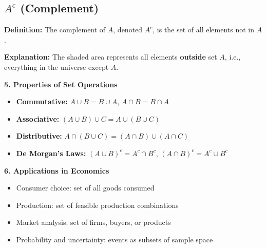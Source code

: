 \begin{tcolorbox}[sectionbox]
\subsection*{$A^c$ (Complement)}
\textbf{Definition:} The complement of $A$, denoted $A^c$, is the set of all elements not in $A$.  

\begin{center}
\end{center}

\textbf{Explanation:} The shaded area represents all elements \textbf{outside} set $A$, i.e., everything in the universe except $A$.
\end{tcolorbox}

\begin{tcolorbox}[sectionbox]
\textbf{5. Properties of Set Operations}
\begin{itemize}
    \item \textbf{Commutative:} $A \cup B = B \cup A$, $A \cap B = B \cap A$
    \item \textbf{Associative:} $(A \cup B) \cup C = A \cup (B \cup C)$
    \item \textbf{Distributive:} $A \cap (B \cup C) = (A \cap B) \cup (A \cap C)$
    \item \textbf{De Morgan’s Laws:} $(A \cup B)^c = A^c \cap B^c$, $(A \cap B)^c = A^c \cup B^c$
\end{itemize}
\end{tcolorbox}

\begin{tcolorbox}[sectionbox]
\textbf{6. Applications in Economics}
\begin{itemize}
    \item Consumer choice: set of all goods consumed
    \item Production: set of feasible production combinations
    \item Market analysis: set of firms, buyers, or products
    \item Probability and uncertainty: events as subsets of sample space
\end{itemize}
\end{tcolorbox}

